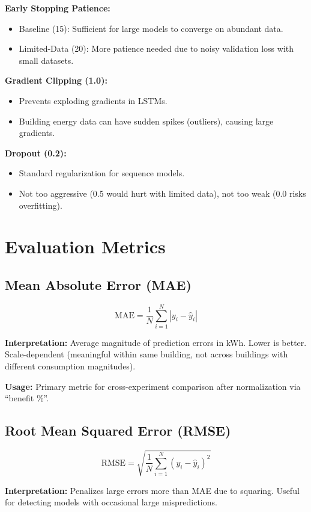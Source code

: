 \documentclass[12pt,a4paper]{report}
\begin{document}
\textbf{Early Stopping Patience:}
\begin{itemize}
    \item Baseline (15): Sufficient for large models to converge on abundant data.
    \item Limited-Data (20): More patience needed due to noisy validation loss with small datasets.
\end{itemize}

\textbf{Gradient Clipping (1.0):}
\begin{itemize}
    \item Prevents exploding gradients in LSTMs.
    \item Building energy data can have sudden spikes (outliers), causing large gradients.
\end{itemize}

\textbf{Dropout (0.2):}
\begin{itemize}
    \item Standard regularization for sequence models.
    \item Not too aggressive (0.5 would hurt with limited data), not too weak (0.0 risks overfitting).
\end{itemize}

\section{Evaluation Metrics}

\subsection{Mean Absolute Error (MAE)}

\[
\text{MAE} = \frac{1}{N} \sum_{i=1}^{N} |y_i - \hat{y}_i|
\]

\textbf{Interpretation:} Average magnitude of prediction errors in kWh. Lower is better. Scale-dependent (meaningful within same building, not across buildings with different consumption magnitudes).

\textbf{Usage:} Primary metric for cross-experiment comparison after normalization via ``benefit \%''.

\subsection{Root Mean Squared Error (RMSE)}

\[
\text{RMSE} = \sqrt{\frac{1}{N} \sum_{i=1}^{N} (y_i - \hat{y}_i)^2}
\]

\textbf{Interpretation:} Penalizes large errors more than MAE due to squaring. Useful for detecting models with occasional large mispredictions.
\end{document}
